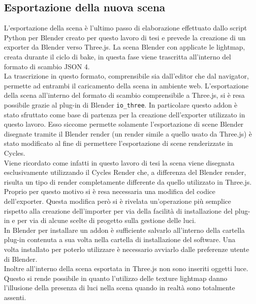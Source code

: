 \subsection{Esportazione della nuova scena}
\label{sec:chapter_baking_service_pipeline_baking_esport_scena}
L’esportazione della scena è l’ultimo passo di elaborazione effettuato dallo script Python per Blender creato per questo lavoro di tesi e prevede la creazione di un exporter da Blender verso Three.js. 
La scena Blender con applicate le lightmap, creata durante il ciclo di bake, in questa fase viene trascritta all’interno del formato di scambio JSON 4. 
\\
La trascrizione in questo formato, comprensibile sia dall’editor che dal navigator, permette ad entrambi il caricamento della scena in ambiente web.
L’esportazione della scena all’interno del formato di scambio comprensibile a Three.js, si è resa possibile grazie al plug-in di Blender \texttt{io\_three}. 
In particolare questo addon è stato sfruttato come base di partenza per la creazione dell’exporter utilizzato in questo lavoro.
Esso siccome permette solamente l’esportazione di scene Blender disegnate tramite il Blender render (un render simile a quello usato da Three.js) è stato modificato al fine di permettere l’esportazione di scene renderizzate in Cycles.
\\
Viene ricordato come infatti in questo lavoro di tesi la scena viene disegnata esclusivamente utilizzando il Cycles Render che, a differenza del Blender render, risulta un tipo di render completamente differente da quello utilizzato in Three.js. 
Proprio per questo motivo si è resa necessaria una modifica del codice dell’exporter.
Questa modifica però si è rivelata un’operazione più semplice rispetto alla creazione dell’importer per via della facilità di installazione del plug-in e per via di alcune scelte di progetto sulla gestione delle luci.
\\
In Blender per installare un addon è sufficiente salvarlo all’interno della cartella plug-in contenuta a sua volta nella cartella di installazione del software. 
Una volta installato per poterlo utilizzare è necessario avviarlo dalle preferenze utente di Blender.
\\
Inoltre all’interno della scena esportata in Three.js non sono inseriti oggetti luce. 
Questo si rende possibile in quanto l’utilizzo delle texture lightmap danno l’illusione della presenza di luci nella scena quando in realtà sono totalmente assenti.
\\
